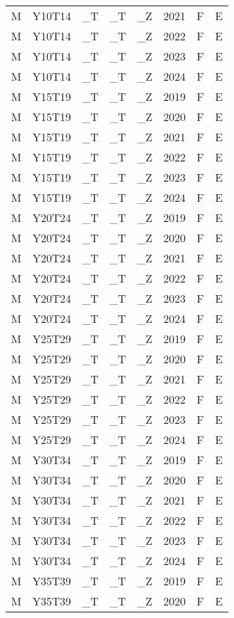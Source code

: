 \begin{longtable}[t]{llllllll}
M & Y10T14 & \_T & \_T & \_Z & 2021 & F & E\\
M & Y10T14 & \_T & \_T & \_Z & 2022 & F & E\\
M & Y10T14 & \_T & \_T & \_Z & 2023 & F & E\\
M & Y10T14 & \_T & \_T & \_Z & 2024 & F & E\\
\addlinespace
M & Y15T19 & \_T & \_T & \_Z & 2019 & F & E\\
M & Y15T19 & \_T & \_T & \_Z & 2020 & F & E\\
M & Y15T19 & \_T & \_T & \_Z & 2021 & F & E\\
M & Y15T19 & \_T & \_T & \_Z & 2022 & F & E\\
M & Y15T19 & \_T & \_T & \_Z & 2023 & F & E\\
\addlinespace
M & Y15T19 & \_T & \_T & \_Z & 2024 & F & E\\
M & Y20T24 & \_T & \_T & \_Z & 2019 & F & E\\
M & Y20T24 & \_T & \_T & \_Z & 2020 & F & E\\
M & Y20T24 & \_T & \_T & \_Z & 2021 & F & E\\
M & Y20T24 & \_T & \_T & \_Z & 2022 & F & E\\
\addlinespace
M & Y20T24 & \_T & \_T & \_Z & 2023 & F & E\\
M & Y20T24 & \_T & \_T & \_Z & 2024 & F & E\\
M & Y25T29 & \_T & \_T & \_Z & 2019 & F & E\\
M & Y25T29 & \_T & \_T & \_Z & 2020 & F & E\\
M & Y25T29 & \_T & \_T & \_Z & 2021 & F & E\\
\addlinespace
M & Y25T29 & \_T & \_T & \_Z & 2022 & F & E\\
M & Y25T29 & \_T & \_T & \_Z & 2023 & F & E\\
M & Y25T29 & \_T & \_T & \_Z & 2024 & F & E\\
M & Y30T34 & \_T & \_T & \_Z & 2019 & F & E\\
M & Y30T34 & \_T & \_T & \_Z & 2020 & F & E\\
\addlinespace
M & Y30T34 & \_T & \_T & \_Z & 2021 & F & E\\
M & Y30T34 & \_T & \_T & \_Z & 2022 & F & E\\
M & Y30T34 & \_T & \_T & \_Z & 2023 & F & E\\
M & Y30T34 & \_T & \_T & \_Z & 2024 & F & E\\
M & Y35T39 & \_T & \_T & \_Z & 2019 & F & E\\
\addlinespace
M & Y35T39 & \_T & \_T & \_Z & 2020 & F & E\\

\end{longtable}
